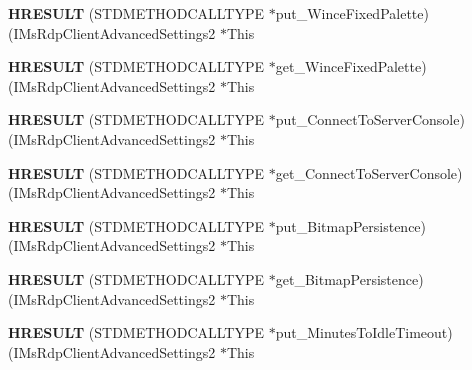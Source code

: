 \begin{DoxyCompactItemize}
{\bfseries H\+R\+E\+S\+U\+LT} (S\+T\+D\+M\+E\+T\+H\+O\+D\+C\+A\+L\+L\+T\+Y\+PE $\ast$put\+\_\+\+Wince\+Fixed\+Palette)(I\+Ms\+Rdp\+Client\+Advanced\+Settings2 $\ast$This
\item 
\mbox{\label{struct_i_ms_rdp_client_advanced_settings2_vtbl_a03c4cce931f9e7d6b964bb9d7e91169d}} 
{\bfseries H\+R\+E\+S\+U\+LT} (S\+T\+D\+M\+E\+T\+H\+O\+D\+C\+A\+L\+L\+T\+Y\+PE $\ast$get\+\_\+\+Wince\+Fixed\+Palette)(I\+Ms\+Rdp\+Client\+Advanced\+Settings2 $\ast$This
\item 
\mbox{\label{struct_i_ms_rdp_client_advanced_settings2_vtbl_aee5d4e6a9c5d69d2ad12114056fc3375}} 
{\bfseries H\+R\+E\+S\+U\+LT} (S\+T\+D\+M\+E\+T\+H\+O\+D\+C\+A\+L\+L\+T\+Y\+PE $\ast$put\+\_\+\+Connect\+To\+Server\+Console)(I\+Ms\+Rdp\+Client\+Advanced\+Settings2 $\ast$This
\item 
\mbox{\label{struct_i_ms_rdp_client_advanced_settings2_vtbl_a223d661d7ca4cb3c53db11a7f3ecde60}} 
{\bfseries H\+R\+E\+S\+U\+LT} (S\+T\+D\+M\+E\+T\+H\+O\+D\+C\+A\+L\+L\+T\+Y\+PE $\ast$get\+\_\+\+Connect\+To\+Server\+Console)(I\+Ms\+Rdp\+Client\+Advanced\+Settings2 $\ast$This
\item 
\mbox{\label{struct_i_ms_rdp_client_advanced_settings2_vtbl_a0799570ac57c430d4debcbc703f78730}} 
{\bfseries H\+R\+E\+S\+U\+LT} (S\+T\+D\+M\+E\+T\+H\+O\+D\+C\+A\+L\+L\+T\+Y\+PE $\ast$put\+\_\+\+Bitmap\+Persistence)(I\+Ms\+Rdp\+Client\+Advanced\+Settings2 $\ast$This
\item 
\mbox{\label{struct_i_ms_rdp_client_advanced_settings2_vtbl_a774ac7222c7cebf8fce557fcf1fda8c1}} 
{\bfseries H\+R\+E\+S\+U\+LT} (S\+T\+D\+M\+E\+T\+H\+O\+D\+C\+A\+L\+L\+T\+Y\+PE $\ast$get\+\_\+\+Bitmap\+Persistence)(I\+Ms\+Rdp\+Client\+Advanced\+Settings2 $\ast$This
\item 
\mbox{\label{struct_i_ms_rdp_client_advanced_settings2_vtbl_a0a535a9d50134c5c5abf34c39a48538b}} 
{\bfseries H\+R\+E\+S\+U\+LT} (S\+T\+D\+M\+E\+T\+H\+O\+D\+C\+A\+L\+L\+T\+Y\+PE $\ast$put\+\_\+\+Minutes\+To\+Idle\+Timeout)(I\+Ms\+Rdp\+Client\+Advanced\+Settings2 $\ast$This

\end{DoxyCompactItemize}
